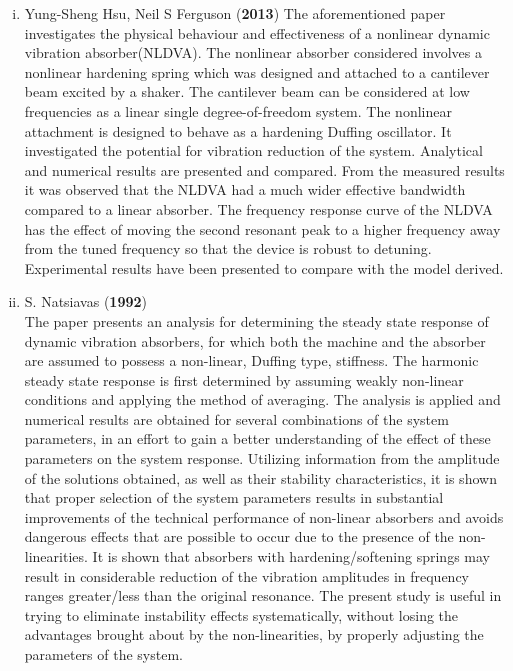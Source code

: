 \begin{enumerate}[i)]
\item {Yung-Sheng Hsu, Neil S Ferguson (\textbf{2013})}
The aforementioned paper investigates the physical behaviour and effectiveness of a nonlinear dynamic vibration absorber(NLDVA). The nonlinear absorber considered involves a nonlinear hardening spring which was designed and attached to a cantilever beam excited by a shaker. The cantilever beam can be considered at low frequencies as a linear single degree-of-freedom system. The nonlinear attachment is designed to behave as a hardening Duffing oscillator.
It investigated the potential for vibration reduction of the system. Analytical and numerical results are presented and compared. From the measured results it was observed that the NLDVA had a much wider effective bandwidth compared to a linear absorber. The frequency response curve of the NLDVA has the effect of moving the second resonant peak to a higher frequency away from the tuned frequency so that the device is robust to detuning.
Experimental results have been presented to compare with
the model derived.

\item {S. Natsiavas (\textbf{1992})}\\
The paper presents an analysis for determining the steady state response of dynamic vibration absorbers, for which both the machine and the absorber are assumed to possess a non-linear, Duffing type, stiffness. The harmonic steady state response is first determined by assuming weakly non-linear conditions and applying the method of averaging.
The analysis is applied and numerical results are obtained for several combinations of the system parameters, in an effort to gain a better understanding of the effect of these parameters on the system response. Utilizing information from the amplitude of the solutions obtained, as well as their stability characteristics, it is shown that proper selection
of the system parameters results in substantial improvements of the technical performance of non-linear absorbers and avoids dangerous effects that are possible to occur due to the presence of the non-linearities. It is shown that absorbers with hardening/softening springs may result in considerable reduction of the vibration amplitudes in frequency ranges greater/less than the original resonance. The present study is useful in trying to eliminate instability effects systematically, without losing the advantages brought about by the non-linearities, by properly adjusting the parameters of the system.\\
\end{enumerate}

